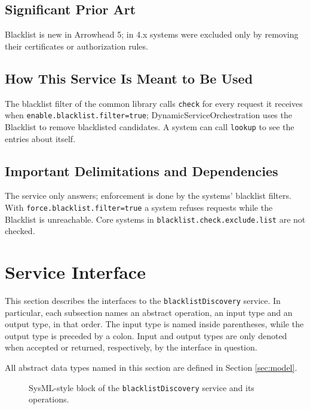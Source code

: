 \documentclass[a4paper]{arrowhead}
\begin{document}
\subsection{Significant Prior Art}

Blacklist is new in Arrowhead 5; in 4.x systems were excluded only by removing their certificates or authorization rules.

\subsection{How This Service Is Meant to Be Used}

The blacklist filter of the common library calls \texttt{check} for every request it receives when \texttt{enable.\allowbreak{}blacklist.\allowbreak{}filter=\allowbreak{}true}; Dynamic\allowbreak{}Service\allowbreak{}Orchestration uses the Blacklist to remove blacklisted candidates. A system can call \texttt{lookup} to see the entries about itself.

\subsection{Important Delimitations and Dependencies}
\label{sec:delimitations}

The service only answers; enforcement is done by the systems' blacklist filters. With \texttt{force.\allowbreak{}blacklist.\allowbreak{}filter=\allowbreak{}true} a system refuses requests while the Blacklist is unreachable. Core systems in \texttt{blacklist.\allowbreak{}check.\allowbreak{}exclude.\allowbreak{}list} are not checked.

\newpage

\section{Service Interface}
\label{sec:operations}

This section describes the interfaces to the \texttt{blacklistDiscovery} service.
In particular, each subsection names an abstract operation, an input type and an output type, in that order.
The input type is named inside parentheses, while the output type is preceded by a colon.
Input and output types are only denoted when accepted or returned, respectively, by the interface in question.

All abstract data types named in this section are defined in Section \ref{sec:model}.

\begin{figure}[ht!]
  \centering
  \caption{SysML-style block of the \texttt{blacklistDiscovery} service and its operations.}
  \label{fig:SD}
\end{figure}
\end{document}
